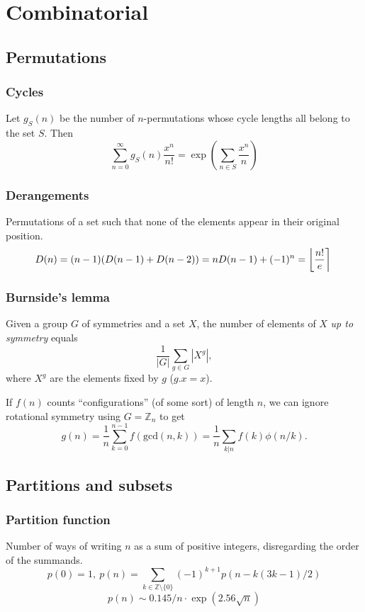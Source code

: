 \chapter{Combinatorial}

\section{Permutations}

	\subsection{Cycles}
		Let $g_S(n)$ be the number of $n$-permutations whose cycle lengths all belong to the set $S$. Then
		$$\sum_{n=0} ^\infty g_S(n) \frac{x^n}{n!} = \exp\left(\sum_{n\in S} \frac{x^n} {n} \right)$$

	\subsection{Derangements}
		Permutations of a set such that none of the elements appear in their original position.
		\[ \mkern-2mu D(n) = (n-1)(D(n-1)+D(n-2)) = n D(n-1)+(-1)^n = \left\lfloor\frac{n!}{e}\right\rceil \]

	\subsection{Burnside's lemma}
		Given a group $G$ of symmetries and a set $X$, the number of elements of $X$ \emph{up to symmetry} equals
		 \[ {\frac {1}{|G|}}\sum _{{g\in G}}|X^{g}|, \]
		 where $X^{g}$ are the elements fixed by $g$ ($g.x = x$).

		 If $f(n)$ counts ``configurations'' (of some sort) of length $n$, we can ignore rotational symmetry using $G = \mathbb Z_n$ to get
		 \[ g(n) = \frac 1 n \sum_{k=0}^{n-1}{f(\text{gcd}(n, k))} = \frac 1 n \sum_{k|n}{f(k)\phi(n/k)}. \]

\section{Partitions and subsets}
	\subsection{Partition function}
		Number of ways of writing $n$ as a sum of positive integers, disregarding the order of the summands.
		\[ p(0) = 1,\ p(n) = \sum_{k \in \mathbb Z \setminus \{0\}}{(-1)^{k+1} p(n - k(3k-1) / 2)} \]
		\[ p(n) \sim 0.145 / n \cdot \exp(2.56 \sqrt{n}) \]

